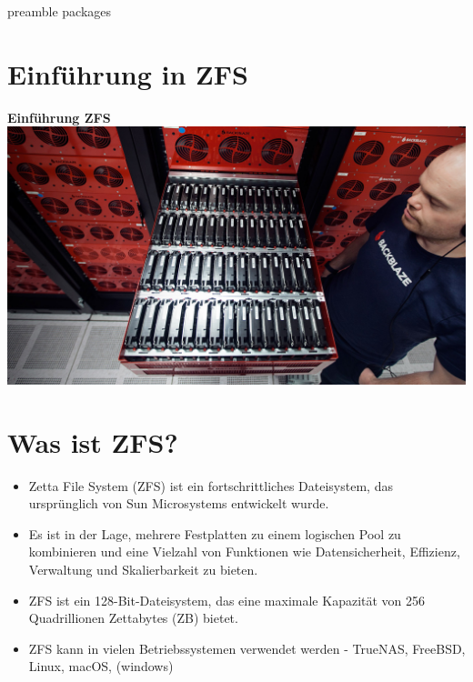 \RequirePackage{import}
{preamble}
{packages}


    \section{Einführung in ZFS}\label{sec:einfuerung-zfs}
    \begin{frame}[c]
        \centering
        \Large
        \textbf{Einführung ZFS}
        \\
        \vspace{1em}
        \includegraphics[scale=0.15]{../pictures/ZFS-Intro.png}
        \linebreak
    \end{frame}

    \section{Was ist ZFS?}\label{sec:was-ist-zfs}
    \begin{frame}
        \slidehead
        \begin{itemize}[<+->]
        \item Zetta File System (ZFS) ist ein fortschrittliches Dateisystem, das ursprünglich von Sun Microsystems entwickelt wurde.
        \item Es ist in der Lage, mehrere Festplatten zu einem logischen Pool zu kombinieren und eine Vielzahl von Funktionen wie Datensicherheit, Effizienz, Verwaltung und Skalierbarkeit zu bieten.
        \item ZFS ist ein 128-Bit-Dateisystem, das eine maximale Kapazität von 256 Quadrillionen Zettabytes (ZB) bietet.
        \item ZFS kann in vielen Betriebssystemen verwendet werden - TrueNAS, FreeBSD, Linux, macOS, (windows)
        \end{itemize}
    \end{frame}

